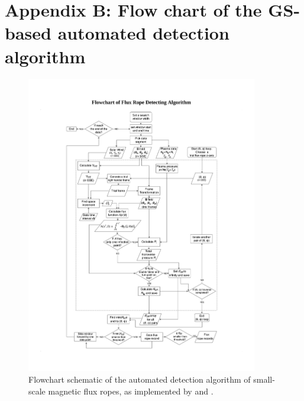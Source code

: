 \chapter{Appendix B: Flow chart of the GS-based automated detection algorithm}\label{appendix:gs-flowchart}

\renewcommand{\thechapter}{B}
\setcounter{figure}{0} 

\begin{figure}
    \centering
    \includegraphics[width=0.9\textwidth]{Figures/Flowchart of Flux Rope Detecting Algorithm.pdf}
    \caption[Flowchart of GS-reconstruction based automated detection algorithm]{Flowchart schematic of the automated detection algorithm of small-scale magnetic flux ropes, as implemented by \cite{Hu:2018} and \cite{Zheng:2018}.}
    \label{fig:flowchart}
\end{figure}